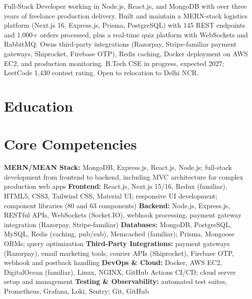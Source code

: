 \documentclass[11pt,a4paper,sans]{moderncv}
\begin{document}
\makecvtitle


\vspace{4pt}
\small{Full-Stack Developer working in Node.js, React.js, and MongoDB with over three years of freelance production delivery. Built and maintain a MERN-stack logistics platform (Next.js 16, Express.js, Prisma, PostgreSQL) with 145 REST endpoints and 1,000+ orders processed, plus a real-time quiz platform with WebSockets and RabbitMQ. Owns third-party integrations (Razorpay, Stripe-familiar payment gateways, Shiprocket, Firebase OTP), Redis caching, Docker deployment on AWS EC2, and production monitoring. B.Tech CSE in progress, expected 2027; LeetCode 1,430 contest rating. Open to relocation to Delhi NCR.}


\section{Education}
\vspace{1pt}


\section{Core Competencies}
\vspace{1pt}
\raggedright
\textbf{MERN/MEAN Stack:} MongoDB, Express.js, React.js, Node.js; full-stack development from frontend to backend, including MVC architecture for complex production web apps \textbar{}
\textbf{Frontend:} React.js, Next.js 15/16, Redux (familiar), HTML5, CSS3, Tailwind CSS, Material UI; responsive UI development; component libraries (80 and 63 components) \textbar{}
\textbf{Backend:} Node.js, Express.js, RESTful APIs, WebSockets (Socket.IO), webhook processing, payment gateway integration (Razorpay, Stripe-familiar) \textbar{}
\textbf{Databases:} MongoDB, PostgreSQL, MySQL, Redis (caching, pub/sub), Memcached (familiar); Prisma, Mongoose ORMs; query optimization \textbar{}
\textbf{Third-Party Integrations:} payment gateways (Razorpay), email marketing tools, courier APIs (Shiprocket), Firebase OTP, webhook and postback handling \textbar{}
\textbf{DevOps \& Cloud:} Docker, AWS EC2, DigitalOcean (familiar), Linux, NGINX, GitHub Actions CI/CD; cloud server setup and management \textbar{}
\textbf{Testing \& Observability:} automated test suites, Prometheus, Grafana, Loki, Sentry; Git, GitHub
\par\normalfont
\end{document}
